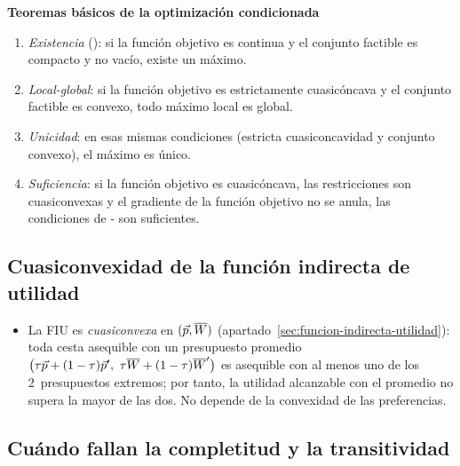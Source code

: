 \documentclass[11pt]{article}
\begin{document}
\begin{anotaciones}
\textbf{Teoremas básicos de la optimización condicionada}\nocite{SydsaeterEtAl2008Further}
\begin{enumerate}
\item \emph{Existencia} (): si la función objetivo es continua y el conjunto factible es compacto y no vacío, existe un máximo.
\item \emph{Local-global}: si la función objetivo es estrictamente cuasicóncava y el conjunto factible es convexo, todo máximo local es global.
\item \emph{Unicidad}: en esas mismas condiciones (estricta cuasiconcavidad y conjunto convexo), el máximo es único.
\item \emph{Suficiencia}\nocite{ArrowEnthoven1961Quasi}: si la función objetivo es cuasicóncava, las restricciones son cuasiconvexas y el gradiente de la función objetivo no se anula, las condiciones de - son suficientes.
\end{enumerate}
\end{anotaciones}

\subsection{Cuasiconvexidad de la función indirecta de utilidad}\label{anexo:fiu-cuasiconvexa}

\begin{itemize}
\item La FIU es \emph{cuasiconvexa} en $(\vec{p},\overline{W})$ (apartado~\ref{sec:funcion-indirecta-utilidad}): toda cesta asequible con un presupuesto promedio $\big(\tau \vect{p}+(1-\tau)\vect{p}',\ \tau\overline{W}+(1-\tau)\overline{W}'\big)$ es asequible con al menos uno de los 2~presupuestos extremos; por tanto, la utilidad alcanzable con el promedio no supera la mayor de las dos. No depende de la convexidad de las preferencias.
\end{itemize}

\subsection{Cuándo fallan la completitud y la transitividad}\label{anexo:falla-transitividad}
\end{document}
